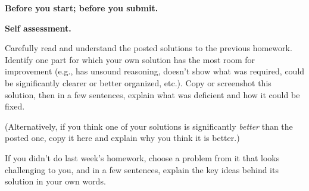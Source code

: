\documentclass[11pt,addpoints,answers]{exam}
\begin{document}
\hwpreface

\begin{questions}

  \addtocounter{question}{-1}
  \question[0] \textbf{Before you start; before you submit.} \nopagebreak
  

  \question[10] \textbf{Self assessment.} \nopagebreak
  
  Carefully read and understand the posted solutions to the previous homework.
  Identify one part for which your own solution has the most room for improvement (e.g., has unsound reasoning, doesn’t show what was required, could be significantly clearer or better organized, etc.).
  Copy or screenshot this solution, then in a few sentences, explain what was deficient and how it could be fixed.

  (Alternatively, if you think one of your solutions is significantly \emph{better} than the posted one, copy it here and explain why you think it is better.)

  If you didn't do last week's homework, choose a problem from it that looks challenging to you, and in a few sentences, explain the key ideas behind its solution in your own words.


\end{questions}
\end{document}
